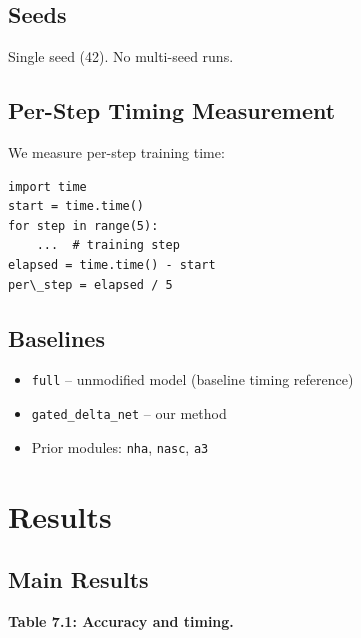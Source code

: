 \subsection{Seeds}

Single seed (42). No multi-seed runs.

\subsection{Per-Step Timing Measurement}

We measure per-step training time:

\begin{lstlisting}
import time
start = time.time()
for step in range(5):
    ...  # training step
elapsed = time.time() - start
per\_step = elapsed / 5
\end{lstlisting}

\subsection{Baselines}

\begin{itemize}
\item \texttt{full} -- unmodified model (baseline timing reference)
\item \texttt{gated\_delta\_net} -- our method
\item Prior modules: \texttt{nha}, \texttt{nasc}, \texttt{a3}

\end{itemize}



\section{Results}

\subsection{Main Results}

\textbf{Table 7.1: Accuracy and timing.}

